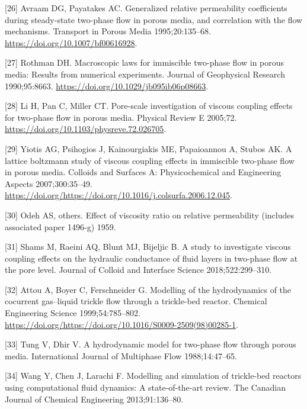 \documentclass[]{article}
\begin{document}
\leavevmode\hypertarget{ref-Avraam1995}{}%
{[}26{]} Avraam DG, Payatakes AC. Generalized relative permeability
coefficients during steady-state two-phase flow in porous media, and
correlation with the flow mechanisms. Transport in Porous Media
1995;20:135--68. \url{https://doi.org/10.1007/bf00616928}.

\leavevmode\hypertarget{ref-Rothman1990}{}%
{[}27{]} Rothman DH. Macroscopic laws for immiscible two-phase flow in
porous media: Results from numerical experiments. Journal of Geophysical
Research 1990;95:8663. \url{https://doi.org/10.1029/jb095ib06p08663}.

\leavevmode\hypertarget{ref-Li2005}{}%
{[}28{]} Li H, Pan C, Miller CT. Pore-scale investigation of viscous
coupling effects for two-phase flow in porous media. Physical Review E
2005;72. \url{https://doi.org/10.1103/physreve.72.026705}.

\leavevmode\hypertarget{ref-Yiotis2007}{}%
{[}29{]} Yiotis AG, Psihogios J, Kainourgiakis ME, Papaioannou A, Stubos
AK. A lattice boltzmann study of viscous coupling effects in immiscible
two-phase flow in porous media. Colloids and Surfaces A: Physicochemical
and Engineering Aspects 2007;300:35--49.
\url{https://doi.org/https://doi.org/10.1016/j.colsurfa.2006.12.045}.

\leavevmode\hypertarget{ref-odeh1959effect}{}%
{[}30{]} Odeh AS, others. Effect of viscosity ratio on relative
permeability (includes associated paper 1496-g) 1959.

\leavevmode\hypertarget{ref-shams2018study}{}%
{[}31{]} Shams M, Raeini AQ, Blunt MJ, Bijeljic B. A study to
investigate viscous coupling effects on the hydraulic conductance of
fluid layers in two-phase flow at the pore level. Journal of Colloid and
Interface Science 2018;522:299--310.

\leavevmode\hypertarget{ref-Attou1999}{}%
{[}32{]} Attou A, Boyer C, Ferschneider G. Modelling of the
hydrodynamics of the cocurrent gas--liquid trickle flow through a
trickle-bed reactor. Chemical Engineering Science 1999;54:785--802.
\url{https://doi.org/https://doi.org/10.1016/S0009-2509(98)00285-1}.

\leavevmode\hypertarget{ref-tung1988hydrodynamic}{}%
{[}33{]} Tung V, Dhir V. A hydrodynamic model for two-phase flow through
porous media. International Journal of Multiphase Flow 1988;14:47--65.

\leavevmode\hypertarget{ref-wang2013modelling}{}%
{[}34{]} Wang Y, Chen J, Larachi F. Modelling and simulation of
trickle-bed reactors using computational fluid dynamics: A
state-of-the-art review. The Canadian Journal of Chemical Engineering
2013;91:136--80.
\end{document}
